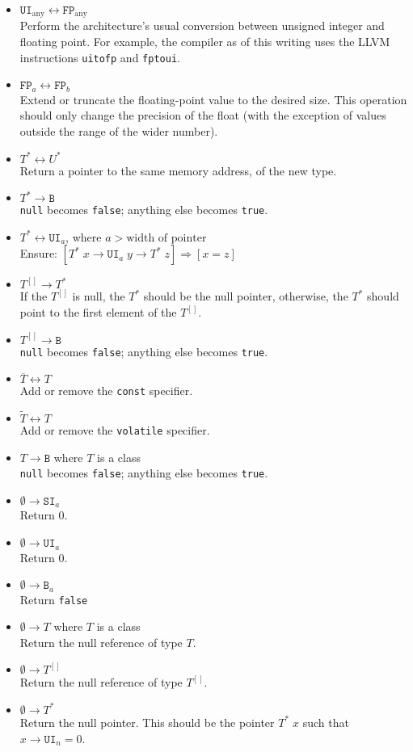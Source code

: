\documentclass{article}
\newcommand{\R}[1]{\mathtt{#1}}
\newcommand{\both}{\leftrightarrow}
\begin{document}
\begin{itemize}
  \item{$\R{UI}_\mathrm{any} \both \R{FP}_\mathrm{any}$ \\
    Perform the architecture's usual conversion between unsigned integer and
    floating point. For example, the compiler as of this writing uses the
    LLVM instructions \texttt{uitofp} and \texttt{fptoui}.}
  \item{$\R{FP}_a \both \R{FP}_b$ \\
    Extend or truncate the floating-point value to the desired size. This
    operation should only change the precision of the float (with the exception
    of values outside the range of the wider number).}
  \item{$T^* \both U^*$ \\
    Return a pointer to the same memory address, of the new type.}
  \item{$T^* \to \R{B}$ \\
    \texttt{null} becomes \texttt{false}; anything else becomes
    \texttt{true}.}
  \item{$T^* \both \R{UI}_a$, where $a > \textrm{width of pointer}$ \\
    Ensure: $[T^*\;x \to \R{UI}_a\;y \to T^*\;z] \Rightarrow [x = z]$}
  \item{$T^{[]} \to T^*$ \\
    If the $T^{[]}$ is null, the $T^*$ should be the null pointer, otherwise,
    the $T^*$ should point to the first element of the $T^{[]}$.}
  \item{$T^{[]} \to \R{B}$ \\
    \texttt{null} becomes \texttt{false}; anything else becomes
    \texttt{true}.}
  \item{$\overline{T} \both T$ \\
    Add or remove the \texttt{const} specifier.}
  \item{$\widetilde{T} \both T$ \\
    Add or remove the \texttt{volatile} specifier.}
  \item{$T \to \R{B}$ where $T$ is a class \\
    \texttt{null} becomes \texttt{false}; anything else becomes
    \texttt{true}.}
  \item{$\emptyset \to \R{SI}_a$ \\
    Return $0$.}
  \item{$\emptyset \to \R{UI}_a$ \\
    Return $0$.}
  \item{$\emptyset \to \R{B}_a$ \\
    Return \texttt{false}}
  \item{$\emptyset \to T$ where $T$ is a class \\
    Return the null reference of type $T$.}
  \item{$\emptyset \to T^{[]}$ \\
    Return the null reference of type $T^{[]}$.}
  \item{$\emptyset \to T^*$ \\
    Return the null pointer. This should be the pointer $T^*\;x$ such that
    $x \to \R{UI}_n = 0$.}
\end{itemize}
\end{document}
